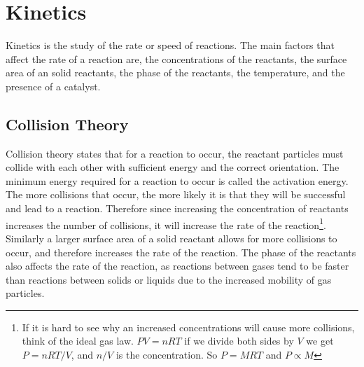 \section{Kinetics}
Kinetics is the study of the rate or speed of reactions. The main factors that affect the rate of a reaction are, the concentrations of the reactants, the surface area of an solid reactants, the phase of the reactants, the temperature, and the presence of a catalyst. 
\subsection{Collision Theory}
Collision theory states that for a reaction to occur, the reactant particles must collide with each other with sufficient energy and the correct orientation. The minimum energy required for a reaction to occur is called the activation energy. The more collisions that occur, the more likely it is that they will be successful and lead to a reaction. Therefore since increasing the concentration of reactants increases the number of collisions, it will increase the rate of the reaction\footnote{If it is hard to see why an increased concentrations will cause more collisions, think of the ideal gas law. $PV=nRT$ if we divide both sides by $V$ we get $P=nRT/V$, and $n/V$ is the concentration. So $P=MRT$ and $P\propto M$}.
Similarly a larger surface area of a solid reactant allows for more collisions to occur, and therefore increases the rate of the reaction. The phase of the reactants also affects the rate of the reaction, as reactions between gases tend to be faster than reactions between solids or liquids due to the increased mobility of gas particles.
